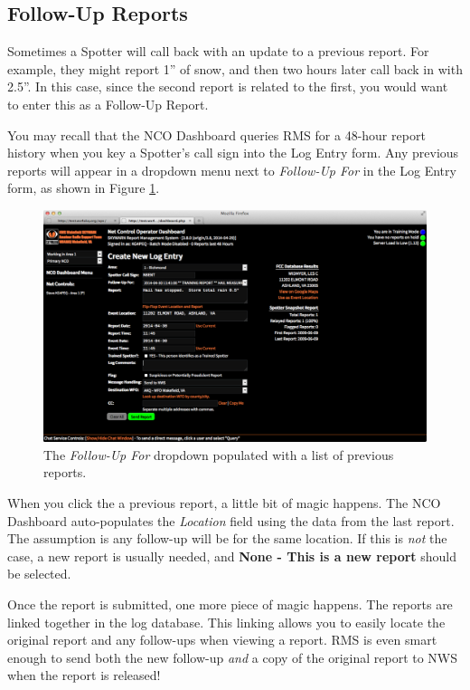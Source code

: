 \documentclass[pdflatex,letterpaper,twoside,12pt]{book}
\begin{document}
\subsection{Follow-Up Reports}\label{follow-up-reports}

Sometimes a Spotter will call back with an update to a previous report.  For example, they might report 1'' of snow, and then two hours later call back in with 2.5''.  In this case, since the second report is related to the first, you would want to enter this as a Follow-Up Report.

You may recall that the NCO Dashboard queries RMS for a 48-hour report history when you key a Spotter's call sign into the Log Entry form.  Any previous reports will appear in a dropdown menu next to \emph{Follow-Up For} in the Log Entry form, as shown in Figure \ref{fig:dash-followup-create}.

\begin{figure}[h]
  \centering
  \includegraphics[width=\textwidth,keepaspectratio=true]{img/dash-followup-create}
  \caption{The \emph{Follow-Up For} dropdown populated with a list of previous reports.\label{fig:dash-followup-create}}
\end{figure}

When you click the a previous report, a little bit of magic happens.  The NCO Dashboard auto-populates the \emph{Location} field using the data from the last report.  The assumption is any follow-up will be for the same location.  If this is \emph{not} the case, a new report is usually needed, and \textbf{None - This is a new report} should be selected.

Once the report is submitted, one more piece of magic happens.  The reports are linked together in the log database.  This linking allows you to easily locate the original report and any follow-ups when viewing a report.  RMS is even smart enough to send both the new follow-up \emph{and} a copy of the original report to NWS when the report is released!
\end{document}
